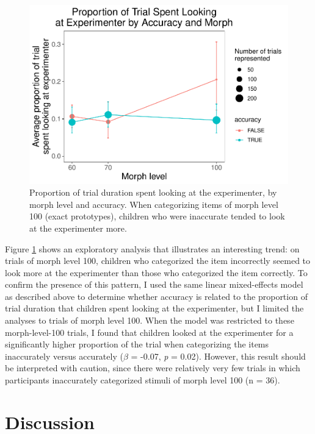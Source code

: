 \documentclass[,man,floatsintext]{apa6}
\begin{document}
\begin{figure}
\centering
\includegraphics{soc_ref_category_paper_files/figure-latex/accuracylookingmorph-1.pdf}
\caption{\label{fig:accuracylookingmorph}Proportion of trial duration spent looking at the experimenter, by morph level and accuracy. When categorizing items of morph level 100 (exact prototypes), children who were inaccurate tended to look at the experimenter more.}
\end{figure}

Figure \ref{fig:accuracylookingmorph} shows an exploratory analysis that illustrates an interesting trend: on trials of morph level 100, children who categorized the item incorrectly seemed to look more at the experimenter than those who categorized the item correctly. To confirm the presence of this pattern, I used the same linear mixed-effects model as described above to determine whether accuracy is related to the proportion of trial duration that children spent looking at the experimenter, but I limited the analyses to trials of morph level 100. When the model was restricted to these morph-level-100 trials, I found that children looked at the experimenter for a significantly higher proportion of the trial when categorizing the items inaccurately versus accurately (\(\beta\) = -0.07, \emph{p} = 0.02). However, this result should be interpreted with caution, since there were relatively very few trials in which participants inaccurately categorized stimuli of morph level 100 (n = 36).

\hypertarget{discussion}{%
\section{Discussion}\label{discussion}}
\end{document}
